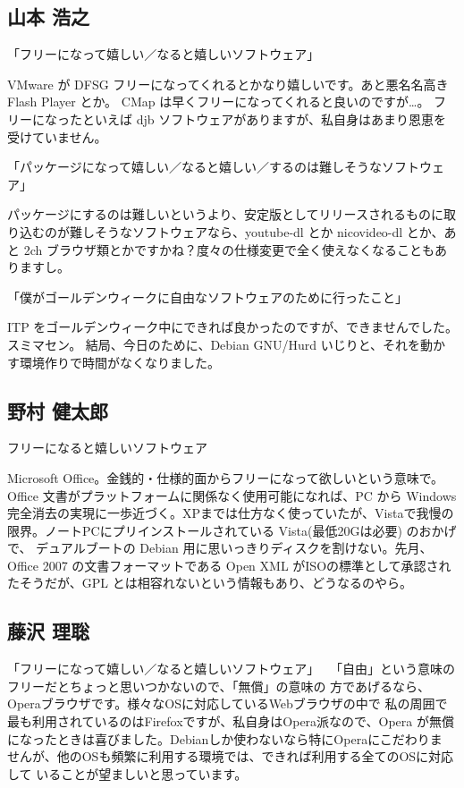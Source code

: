 \documentclass[mingoth,a4paper]{jsarticle}
\begin{document}
\begin{multicols}{2}
\subsection{山本 浩之}

「フリーになって嬉しい／なると嬉しいソフトウェア」

VMware が DFSG フリーになってくれるとかなり嬉しいです。あと悪名名高き Flash Player とか。
CMap は早くフリーになってくれると良いのですが…。
フリーになったといえば djb ソフトウェアがありますが、私自身はあまり恩恵を受けていません。

「パッケージになって嬉しい／なると嬉しい／するのは難しそうなソフトウェア」

パッケージにするのは難しいというより、安定版としてリリースされるものに取り込むのが難しそうなソフトウェアなら、youtube-dl とか
nicovideo-dl とか、あと 2ch ブラウザ類とかですかね？度々の仕様変更で全く使えなくなることもありますし。

「僕がゴールデンウィークに自由なソフトウェアのために行ったこと」

ITP をゴールデンウィーク中にできれば良かったのですが、できませんでした。スミマセン。
結局、今日のために、Debian GNU/Hurd いじりと、それを動かす環境作りで時間がなくなりました。


\subsection{野村 健太郎}
フリーになると嬉しいソフトウェア

Microsoft Office。金銭的・仕様的面からフリーになって欲しいという意味で。
Office 文書がプラットフォームに関係なく使用可能になれば、PC から Windows
完全消去の実現に一歩近づく。XPまでは仕方なく使っていたが、Vistaで我慢の
限界。ノートPCにプリインストールされている Vista(最低20Gは必要) のおかげで、
デュアルブートの Debian 用に思いっきりディスクを割けない。先月、Office 2007
の文書フォーマットである Open XML がISOの標準として承認されたそうだが、GPL
とは相容れないという情報もあり、どうなるのやら。

\subsection{藤沢 理聡}

「フリーになって嬉しい／なると嬉しいソフトウェア」
　「自由」という意味のフリーだとちょっと思いつかないので、「無償」の意味の
方であげるなら、Operaブラウザです。様々なOSに対応しているWebブラウザの中で
私の周囲で最も利用されているのはFirefoxですが、私自身はOpera派なので、Opera
が無償になったときは喜びました。Debianしか使わないなら特にOperaにこだわりま
せんが、他のOSも頻繁に利用する環境では、できれば利用する全てのOSに対応して
いることが望ましいと思っています。


\end{multicols}
\end{document}
